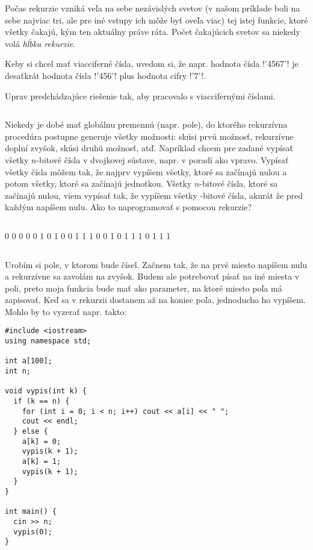 Počas rekurzie vzniká veľa na sebe  nezávislých svetov (v našom príklade boli na sebe najviac tri, 
ale pre iné vstupy ich môže byť oveľa viac) tej istej funkcie, ktoré všetky čakajú, kým ten 
aktuálny práve ráta. Počet čakajúcich svetov sa niekedy volá {\em hĺbka rekurzie}.


Keby si chcel mať viacciferné čísla, uvedom si, že napr. hodnota čísla \prg!'4567'! je
desaťkrát hodnota čísla \prg!'456'! plus hodnota cifry \prg!'7'!.

\begin{uloha}
  Uprav predchádzajúce riešenie tak, aby pracovalo s viaccifernými číslami.
\end{uloha}


\begin{column}{0.6}
Niekedy je dobé mať globálnu premennú (napr. pole), do ktorého rekurzívna procedúra
postupne generuje všetky možnosti: skúsi prvú možnosť, rekurzívne doplní zvyšok, skúsi
druhú možnosť, atď. Napríklad chcem pre zadané   vypísať všetky
$n$-bitové čísla v dvojkovej sústave, napr. v poradí ako vpravo.
Vypísať všetky čísla môžem tak, že najprv vypíšem všetky, ktoré sa začínajú nulou a potom
všetky, ktoré sa začínajú jednotkou. Všetky $n$-bitové čísla, ktoré sa začínajú nulou, viem
vypísať tak, že vypíšem všetky -bitové čísla, akurát že pred každým napíšem nulu.
Ako to naprogramovať s pomocou rekurzie? 
\end{column}\hfill\begin{column}{0.3}
\begin{outputBox}
0 0 0 
0 0 1 
0 1 0 
0 1 1 
1 0 0 
1 0 1 
1 1 0 
1 1 1 
\end{outputBox}
\end{column}

Urobím si pole, v ktorom bude  čísel. 
Začnem tak, že na prvé miesto napíšem nulu a rekurzívne sa zavolám na zvyšok. Budem ale potrebovať
písať na iné miesta v poli, preto moja funkcia bude mať ako parameter, na ktoré miesto poľa
má zapisovať. Keď sa v rekurzii dostanem až na koniec poľa, jednoducho ho vypíšem. Mohlo by to 
vyzerať napr. takto:

\begin{lstlisting}
#include <iostream>
using namespace std;

int a[100];
int n;

void vypis(int k) {
  if (k == n) {
    for (int i = 0; i < n; i++) cout << a[i] << " ";
    cout << endl;
  } else {
    a[k] = 0;
    vypis(k + 1);
    a[k] = 1;
    vypis(k + 1);
  }
}

int main() {
  cin >> n;
  vypis(0);
}
\end{lstlisting}

